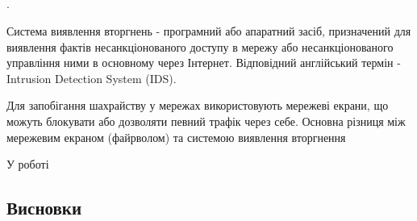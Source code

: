 \newpage
{}
\subsection{\TBD}
    \TBD \cite{ben2005outlier}.

	Система виявлення вторгнень - програмний або апаратний засіб, призначений для виявлення фактів несанкціонованого доступу в мережу або несанкціонованого управління ними в основному через Інтернет. Відповідний англійський термін - Intrusion Detection System (IDS).

	Для запобігання шахрайству у мережах використовують мережеві екрани, що можуть блокувати або дозволяти певний трафік через себе. \TBD
	Основна різниця між мережевим екраном (файрволом) та системою виявлення вторгнення

    У роботі \cite{denning1987intrusion}
\subsection{\TBD}
    \TBD
\newpage
\subsection*{Висновки}
    \TBD
